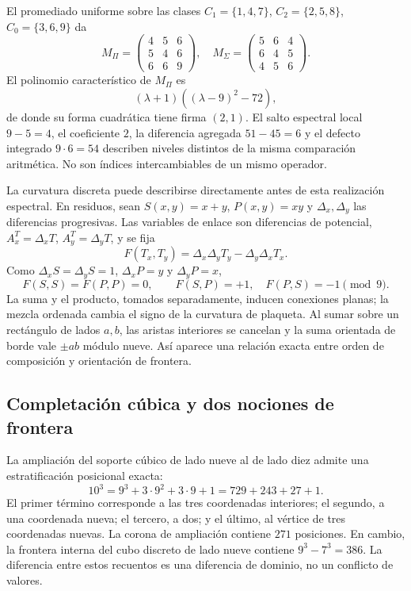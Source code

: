 El promediado uniforme sobre las clases \(C_1=\{1,4,7\}\), \(C_2=\{2,5,8\}\), \(C_0=\{3,6,9\}\) da
\[
 M_\Pi=\begin{pmatrix}4&5&6\\5&4&6\\6&6&9\end{pmatrix},\quad
 M_\Sigma=\begin{pmatrix}5&6&4\\6&4&5\\4&5&6\end{pmatrix}.
\]
El polinomio característico de \(M_\Pi\) es
\[
 (\lambda+1)((\lambda-9)^2-72),
\]
de donde su forma cuadrática tiene firma \((2,1)\). El salto espectral local \(9-5=4\), el coeficiente \(2\), la diferencia agregada \(51-45=6\) y el defecto integrado \(9\cdot6=54\) describen niveles distintos de la misma comparación aritmética. No son índices intercambiables de un mismo operador.

La curvatura discreta puede describirse directamente antes de esta realización espectral. En residuos, sean \(S(x,y)=x+y\), \(P(x,y)=xy\) y \(\Delta_x,\Delta_y\) las diferencias progresivas. Las variables de enlace son diferencias de potencial, \(A_x^T=\Delta_xT\), \(A_y^T=\Delta_yT\), y se fija
\[
 F(T_x,T_y)=\Delta_x\Delta_yT_y-\Delta_y\Delta_xT_x.
\]
Como \(\Delta_xS=\Delta_yS=1\), \(\Delta_xP=y\) y \(\Delta_yP=x\),
\begin{equation}
 F(S,S)=F(P,P)=0,\qquad F(S,P)=+1,\quad F(P,S)=-1\pmod9.
\end{equation}
La suma y el producto, tomados separadamente, inducen conexiones planas; la mezcla ordenada cambia el signo de la curvatura de plaqueta. Al sumar sobre un rectángulo de lados \(a,b\), las aristas interiores se cancelan y la suma orientada de borde vale \(\pm ab\) módulo nueve. Así aparece una relación exacta entre orden de composición y orientación de frontera.

\subsection{Completación cúbica y dos nociones de frontera}

La ampliación del soporte cúbico de lado nueve al de lado diez admite una estratificación posicional exacta:
\begin{equation}
 10^3=9^3+3\cdot9^2+3\cdot9+1=729+243+27+1.
 \label{eq:cubo}
\end{equation}
El primer término corresponde a las tres coordenadas interiores; el segundo, a una coordenada nueva; el tercero, a dos; y el último, al vértice de tres coordenadas nuevas. La corona de ampliación contiene \(271\) posiciones. En cambio, la frontera interna del cubo discreto de lado nueve contiene \(9^3-7^3=386\). La diferencia entre estos recuentos es una diferencia de dominio, no un conflicto de valores.

